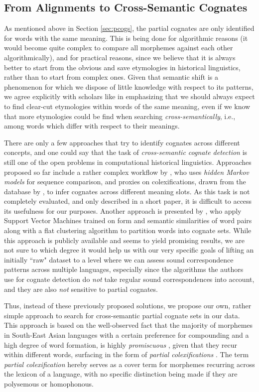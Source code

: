 \documentclass[xetex,svgnames]{scrartcl}
\begin{document}
\subsection{From Alignments to Cross-Semantic Cognates}
As mentioned above in Section \ref{sec:pcogs}, the partial cognates are only identified for words
with the same meaning. This is being done for algorithmic reasons (it would become quite complex to
compare all morphemes against each other algorithmically), and for practical reasons, since we
believe that it is always better to start from the obvious and save etymologies in historical
linguistics, rather than to start from complex ones. Given that semantic shift is a phenomenon for
which we dispose of little knowledge with respect to its patterns, we agree explicitly with scholars
like \citet{Dybo2008} in emphasizing that we should always expect to find clear-cut etymologies
within words of the same meaning, even if we know that more etymologies could be find when searching
\emph{cross-semantically}, i.e., among words which differ with respect to their meanings.

There are only a few approaches that try to identify cognates across different concepts, and one
could say that the task of \emph{cross-semantic cognate detection} is still one of the open problems
in computational historical linguistics. Approaches proposed so far include a rather complex
workflow by \citet{Wahle2016}, who uses \emph{hidden Markov models} for sequence comparison, and
proxies on colexifications, drawn from the database by \citet{Dellert2017}, to infer cognates across
different meaning slots. As this task is not completely evaluated, and only described in a short
paper, it is difficult to access its usefulness for our purposes. Another approach is presented by
\citet{Arnaud2017}, who apply Support Vector Machines trained on form and semantic similarities of
word pairs along with a flat clustering algorithm to partition words into cognate sets.
While this approach is publicly available and seems to yield promising results, we are not sure to
which degree it would help us with our very specific goals of lifting an initially ``raw" dataset
to a level where we can assess sound correspondence patterns across multiple languages, especially
since the algorithms the authors use for cognate detection do \emph{not} take regular sound
correspondences into account, and they are also \emph{not} sensitive to partial cognates.

Thus, instead of these previously proposed solutions, we propose our own, rather simple approach to
search for cross-semantic partial cognate sets in our data. This approach is based on the
well-observed fact that the majority of morphemes in South-East Asian languages with a certain
preference for compounding and a high degree of word formation, is highly \emph{promiscuous}
\citep[8f]{List2016h}, given
that they recur within different words, surfacing in the form of \emph{partial colexifications}
\citep[62]{Hill2017a}. The term \emph{partial colexification} hereby serves as a cover term for
morphemes recurring across the lexicon of a language, with no specific distinction being made if
they are polysemous or homophonous.
\end{document}
